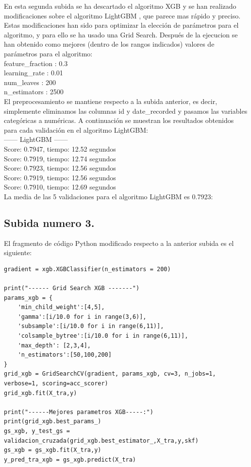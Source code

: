 	En esta segunda subida se ha descartado el algoritmo XGB y se han realizado modificaciones 
	sobre el algoritmo LightGBM , que parece mas rápido y preciso. Estas modificaciones han 
	sido para optimizar la elección de parámetros para el algoritmo, y para ello se ha usado 
	una Grid Search. Después de la ejecucion se han obtenido como mejores (dentro de los 
	rangos indicados) valores de parámetros para el algoritmo: \\
	
	feature\_fraction : 0.3 \\
	learning\_rate : 0.01 \\
	num\_leaves : 200 \\
	n\_estimators : 2500 \\
	
	El preprocesamiento se mantiene respecto a la subida anterior, es decir, simplemente eliminamos las columnas id y date\_recorded  y pasamos las variables 
	categóricas a numéricas. A continuación se muestran los resultados obtenidos para cada validación en el algoritmo LightGBM: \\
	
	------ LightGBM ------\\
	Score: 0.7947, tiempo:  12.52 segundos \\
	Score: 0.7919, tiempo:  12.74 segundos \\
	Score: 0.7923, tiempo:  12.56 segundos \\
	Score: 0.7919, tiempo:  12.56 segundos \\
	Score: 0.7910, tiempo:  12.69 segundos \\  
	
	La media de las 5 validaciones para el algoritmo LightGBM es 0.7923:  \\

	
	\subsection[Subida numero 3]{Subida numero 3.}
	
	El fragmento de código Python modificado respecto a la anterior subida es el siguiente:
	
	\lstset{language=python}
	\begin{lstlisting}[frame=single]
gradient = xgb.XGBClassifier(n_estimators = 200)

print("------ Grid Search XGB -------")
params_xgb = {
	'min_child_weight':[4,5],
	'gamma':[i/10.0 for i in range(3,6)],
	'subsample':[i/10.0 for i in range(6,11)],
	'colsample_bytree':[i/10.0 for i in range(6,11)],
	'max_depth': [2,3,4],
	'n_estimators':[50,100,200]
}
grid_xgb = GridSearchCV(gradient, params_xgb, cv=3, n_jobs=1, verbose=1, scoring=acc_scorer)
grid_xgb.fit(X_tra,y)

print("------Mejores parametros XGB-----:")
print(grid_xgb.best_params_)
gs_xgb, y_test_gs = validacion_cruzada(grid_xgb.best_estimator_,X_tra,y,skf)
gs_xgb = gs_xgb.fit(X_tra,y)
y_pred_tra_xgb = gs_xgb.predict(X_tra)
	\end{lstlisting}
	
